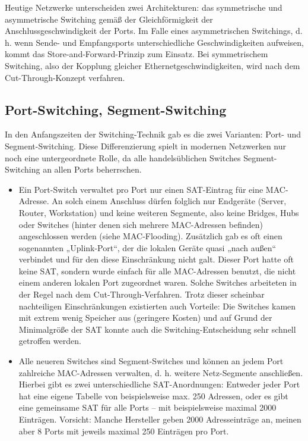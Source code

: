 Heutige Netzwerke unterscheiden zwei Architekturen: das symmetrische und asymmetrische Switching gemäß der Gleichförmigkeit der Anschlussgeschwindigkeit der Ports. Im Falle eines asymmetrischen Switchings, d. h. wenn Sende- und Empfangsports unterschiedliche Geschwindigkeiten aufweisen, kommt das Store-and-Forward-Prinzip zum Einsatz. Bei symmetrischem Switching, also der Kopplung gleicher Ethernetgeschwindigkeiten, wird nach dem Cut-Through-Konzept verfahren.

\subsection{Port-Switching, Segment-Switching}
In den Anfangszeiten der Switching-Technik gab es die zwei Varianten: Port- und Segment-Switching. Diese Differenzierung spielt in modernen Netzwerken nur noch eine untergeordnete Rolle, da alle handelsüblichen Switches Segment-Switching an allen Ports beherrschen.
\begin{itemize}
\item Ein Port-Switch verwaltet pro Port nur einen SAT-Eintrag für eine MAC-Adresse. An solch einem Anschluss dürfen folglich nur Endgeräte (Server, Router, Workstation) und keine weiteren Segmente, also keine Bridges, Hubs oder Switches (hinter denen sich mehrere MAC-Adressen befinden) angeschlossen werden (siehe MAC-Flooding). Zusätzlich gab es oft einen sogenannten „Uplink-Port“, der die lokalen Geräte quasi „nach außen“ verbindet und für den diese Einschränkung nicht galt. Dieser Port hatte oft keine SAT, sondern wurde einfach für alle MAC-Adressen benutzt, die nicht einem anderen lokalen Port zugeordnet waren. Solche Switches arbeiteten in der Regel nach dem Cut-Through-Verfahren. Trotz dieser scheinbar nachteiligen Einschränkungen existierten auch Vorteile: Die Switches kamen mit extrem wenig Speicher aus (geringere Kosten) und auf Grund der Minimalgröße der SAT konnte auch die Switching-Entscheidung sehr schnell getroffen werden.

\item Alle neueren Switches sind Segment-Switches und können an jedem Port zahlreiche MAC-Adressen verwalten, d. h. weitere Netz-Segmente anschließen. Hierbei gibt es zwei unterschiedliche SAT-Anordnungen: Entweder jeder Port hat eine eigene Tabelle von beispielsweise max. 250 Adressen, oder es gibt eine gemeinsame SAT für alle Ports – mit beispielsweise maximal 2000 Einträgen. Vorsicht: Manche Hersteller geben 2000 Adresseinträge an, meinen aber 8 Ports mit jeweils maximal 250 Einträgen pro Port.
\end{itemize}

